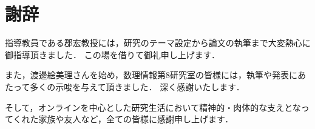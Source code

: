 \documentclass[system, bachelor]{systemB}%
\theoremstyle{break}
\begin{document}
\mainmatter%






\backmatter%
\chapter{謝辞}%
指導教員である郡宏教授には，研究のテーマ設定から論文の執筆まで大変熱心に御指導頂きました．
この場を借りて御礼申し上げます．

また，渡邊絵美理さんを始め，数理情報第8研究室の皆様には，執筆や発表にあたって多くの示唆を与えて頂きました．
深く感謝いたします．

そして，オンラインを中心とした研究生活において精神的・肉体的な支えとなってくれた家族や友人など，全ての皆様に感謝申し上げます．

\appendix%

\end{document}
